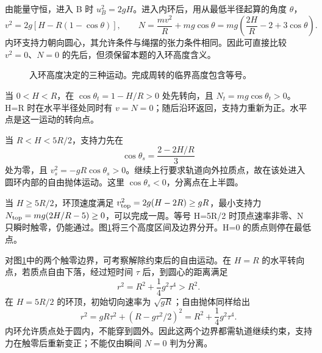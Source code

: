 \begin{solution}
由能量守恒，进入 B 时 $u_B^2=2gH$。进入内环后，用从最低半径起算的角度 $\theta$，
\[
v^2=2g[H-R(1-\cos\theta)],\qquad
N=\frac{mv^2}{R}+mg\cos\theta
=mg\left(\frac{2H}{R}-2+3\cos\theta\right).
\]
内环支持力朝向圆心，其允许条件与绳摆的张力条件相同。因此可直接比较 $v^2=0$、$N=0$ 的先后，但须保留本题的入环高度含义。

\begin{figure}[H]\centering
{}
\caption{入环高度决定的三种运动。完成周转的临界高度包含等号。}\label{sup2:fig:d2-h4-s}
\end{figure}

当 $0<H<R$，在 $\cos\theta_t=1-H/R>0$ 处先转向，且 $N_t=mg\cos\theta_t>0$。H=R 时在水平半径处同时有 $v=N=0$；随后沿环返回，支持力重新为正。水平点是这一运动的转向点。

当 $R<H<5R/2$，支持力先在
\[
\cos\theta_s=\frac{2-2H/R}{3}
\]
处为零，且 $v_s^2=-gR\cos\theta_s>0$。继续上行要求轨道向外拉质点，故在该处进入圆环内部的自由抛体运动。这里 $\cos\theta_s<0$，分离点在上半圆。

当 $H\ge5R/2$，环顶速度满足 $v_{\rm top}^2=2g(H-2R)\ge gR$，最小支持力 $N_{\rm top}=mg(2H/R-5)\ge0$，可以完成一周。等号 H=5R/2 时顶点速率非零、N 只瞬时触零，仍能通过。图\ref{sup2:fig:d2-h4-s}将三个高度区间及边界分开。H=0 的质点则停在最低点。

对图\ref{sup2:fig:d2-h4-s}中的两个触零边界，可考察解除约束后的自由运动。在 $H=R$ 的水平转向点，若质点自由下落，经过短时间 $\tau$ 后，到圆心的距离满足
\[
r^2=R^2+\frac14g^2\tau^4>R^2.
\]
在 $H=5R/2$ 的环顶，初始切向速率为 $\sqrt{gR}$；自由抛体同样给出
\[
r^2=gR\tau^2+(R-g\tau^2/2)^2
=R^2+\frac14g^2\tau^4.
\]
内环允许质点处于圆内，不能穿到圆外。因此这两个边界都需轨道继续约束，支持力在触零后重新变正；不能仅由瞬间 $N=0$ 判为分离。

\end{solution}


